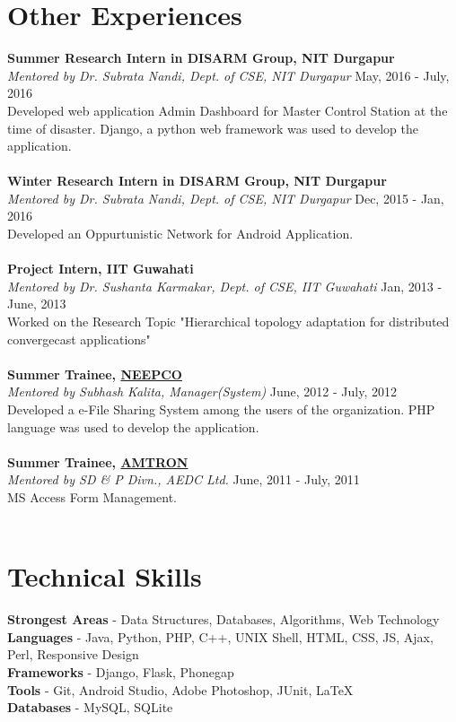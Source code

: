 \documentclass[margin, centered]{res}
\begin{document}
\begin{resume}
\section{Other Experiences}
\textbf{Summer Research Intern in DISARM Group, NIT Durgapur} \\
\emph{Mentored by {Dr. Subrata Nandi, Dept. of CSE, NIT Durgapur}} \hfill May, 2016 - July, 2016 \\
Developed web application Admin Dashboard for Master Control Station at the time of disaster. Django, a python web framework was used to develop the application.\\
\\
\textbf{Winter Research Intern in DISARM Group, NIT Durgapur} \\
\emph{Mentored by {Dr. Subrata Nandi, Dept. of CSE, NIT Durgapur}} \hfill Dec, 2015 - Jan, 2016 \\
Developed an Oppurtunistic Network for Android Application.
\\
\\
\textbf{Project Intern, IIT Guwahati}  \\
\emph{Mentored by {Dr. Sushanta Karmakar, Dept. of CSE, IIT Guwahati}} \hfill Jan, 2013 - June, 2013 \\
Worked on the Research Topic "Hierarchical topology adaptation for distributed convergecast applications"
\\
\\
\textbf{Summer Trainee, \href{http://neepco.co.in/neepco/}{NEEPCO}} \\
\emph{Mentored by {Subhash Kalita, Manager(System)}} \hfill June, 2012 - July, 2012 \\
Developed a e-File Sharing System among the users of the organization. PHP language was used to develop the application.
\\
\\
\textbf{Summer Trainee, \href{http://amtron.in/}{AMTRON}}  \\
\emph{Mentored by {SD \& P Divn., AEDC Ltd.}} \hfill June, 2011 - July, 2011 \\
MS Access Form Management.
\\
\\

\section{Technical \hspace{2mm} Skills}
\textbf{Strongest Areas} - Data Structures, Databases, Algorithms, Web Technology \\
\textbf{Languages} - Java, Python,  PHP, C++, UNIX Shell, HTML, CSS, JS, Ajax, Perl, Responsive Design \\
\textbf{Frameworks} - Django, Flask, Phonegap \\
\textbf{Tools} - Git, Android Studio, Adobe Photoshop, JUnit, \LaTeX \\
\textbf{Databases} - MySQL, SQLite \\


\end{resume}
\end{document}
